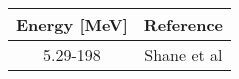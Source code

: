 \begin{tabular}{|c||c|} 
    \hline 
    \bf{Energy [MeV]} & \bf{Reference} \\
    \hline
    \hline 
    5.29-198 & Shane et al\\
    \hline
\end{tabular}
